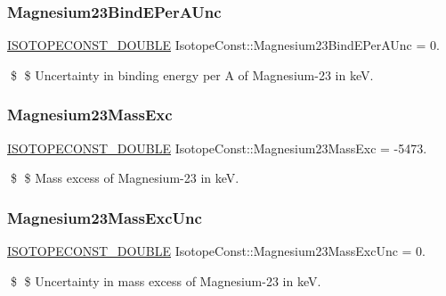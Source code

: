 \subsubsection{\texorpdfstring{Magnesium23\+Bind\+E\+Per\+A\+Unc}{Magnesium23BindEPerAUnc}}
{\footnotesize\ttfamily \mbox{\hyperlink{group___isotope_const-_macros_ga8f45a7272ce02c0b4c65c44636ed719a}{I\+S\+O\+T\+O\+P\+E\+C\+O\+N\+S\+T\+\_\+\+D\+O\+U\+B\+LE}} Isotope\+Const\+::\+Magnesium23\+Bind\+E\+Per\+A\+Unc = 0.}

\$ \$ Uncertainty in binding energy per A of Magnesium-\/23 in keV. \mbox{\label{group___isotope_const-_magnesium-_mg23_ga4c7d55a68c5e1192697ce97dcf29f846}} 
\subsubsection{\texorpdfstring{Magnesium23\+Mass\+Exc}{Magnesium23MassExc}}
{\footnotesize\ttfamily \mbox{\hyperlink{group___isotope_const-_macros_ga8f45a7272ce02c0b4c65c44636ed719a}{I\+S\+O\+T\+O\+P\+E\+C\+O\+N\+S\+T\+\_\+\+D\+O\+U\+B\+LE}} Isotope\+Const\+::\+Magnesium23\+Mass\+Exc = -\/5473.}

\$ \$ Mass excess of Magnesium-\/23 in keV. \mbox{\label{group___isotope_const-_magnesium-_mg23_ga9aca9a5b85f293ea33d2dd6dd9beebd9}} 
\subsubsection{\texorpdfstring{Magnesium23\+Mass\+Exc\+Unc}{Magnesium23MassExcUnc}}
{\footnotesize\ttfamily \mbox{\hyperlink{group___isotope_const-_macros_ga8f45a7272ce02c0b4c65c44636ed719a}{I\+S\+O\+T\+O\+P\+E\+C\+O\+N\+S\+T\+\_\+\+D\+O\+U\+B\+LE}} Isotope\+Const\+::\+Magnesium23\+Mass\+Exc\+Unc = 0.}

\$ \$ Uncertainty in mass excess of Magnesium-\/23 in keV. \mbox{\label{group___isotope_const-_magnesium-_mg23_gae18c6ee9223e775f813de9bd58e4506d}} 

